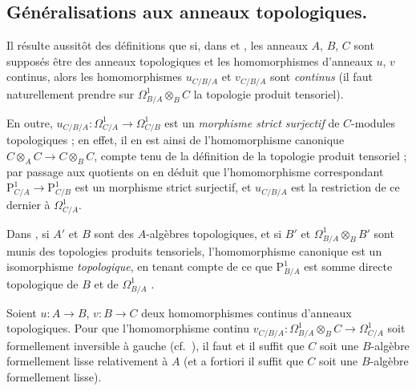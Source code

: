\subsection{Généralisations aux anneaux topologiques.}
\label{subsection:0.20.7-fr}

\begin{env}[20.7.1]
\label{0.20.7.1-fr}
Il résulte aussitôt des définitions que si, dans  et
, les anneaux $A$, $B$, $C$ sont supposés être des anneaux
topologiques et les homomorphismes d'anneaux $u$, $v$ continus, alors les
homomorphismes $u_{C/B/A}$ et $v_{C/B/A}$ sont \emph{continus} (il faut
naturellement prendre sur $\Omega^1_{B/A}\otimes_B C$ la topologie produit
tensoriel).

En outre, $u_{C/B/A}:\Omega^1_{C/A}\to\Omega^1_{C/B}$ est un
\emph{morphisme strict surjectif} de $C$-modules topologiques ; en effet, il en
est ainsi de l'homomorphisme canonique $C\otimes_A C\to C\otimes_B C$, compte
tenu de la définition de la topologie produit tensoriel ; par passage aux
quotients on en déduit que l'homomorphisme correspondant
$\mathrm{P}^1_{C/A}\to\mathrm{P}^1_{C/B}$ est un morphisme strict surjectif,
et $u_{C/B/A}$ est la restriction de ce dernier à $\Omega^1_{C/A}$.

Dans , si $A'$ et $B$ sont des $A$-algèbres topologiques,
et si $B'$ et $\Omega^1_{B/A}\otimes_B B'$ sont munis des topologies produits
tensoriels, l'homomorphisme canonique  est un isomorphisme
\emph{topologique}, en tenant compte de ce que $\mathrm{P}^1_{B/A}$ est somme directe
topologique de $B$ et de $\Omega^1_{B/A}$ .
\end{env}

\begin{proposition}[20.7.2]
\label{0.20.7.2-fr}
Soient $u:A\to B$, $v:B\to C$ deux homomorphismes continus d'anneaux
topologiques. Pour que l'homomorphisme continu
$v_{C/B/A}:\Omega^1_{B/A}\otimes_B C\to\Omega^1_{C/A}$ soit formellement
inversible à gauche \textup{(cf.\ )}, il faut et il suffit que $C$
soit une $B$-algèbre formellement lisse relativement à $A$
\textup{} \textup{(et} a fortiori \textup{il suffit que $C$ soit une
$B$-algèbre formellement lisse)}.
\end{proposition}

